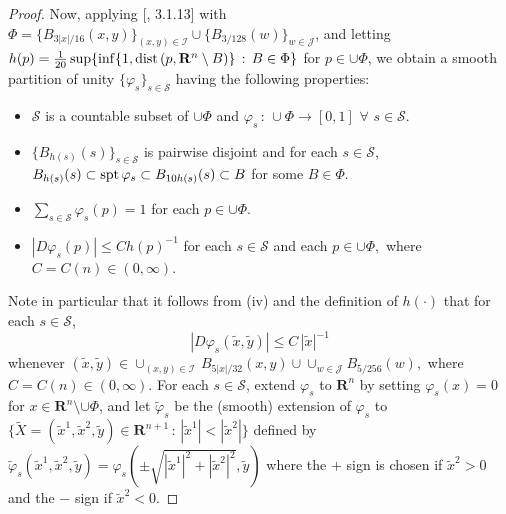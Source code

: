 \documentclass[a4paper,11pt]{amsart}
\begin{document}
\begin{proof}
 Now, applying [\cite{F}, 3.1.13] with 
 $\Phi = \{B_{3|x|/16}(x,y)\}_{(x,y) \in {\mathcal I}} \cup \{B_{3/128}(w)\}_{w \in {\mathcal J}}$, 
 and letting $h(p) = \frac{1}{20}\sup \{\inf\{1, {\rm dist} \, (p, {\mathbf R}^{n} \setminus B)\} \, : \, B \in \Phi\}$ for $p \in \cup \Phi$, we obtain a smooth partition of unity $\{\varphi_{s}\}_{s \in {\mathcal S}}$ having the following properties:
\begin{itemize}
\item[(i)] ${\mathcal S}$ is a countable subset of $\cup \Phi$ and $\varphi_{s} \, : \, \cup \Phi \to [0, 1]$
$\forall$ $s \in {\mathcal S}$.
\item[(ii)] $\{B_{h(s)}(s)\}_{s \in {\mathcal S}}$ is pairwise disjoint and for each $s \in {\mathcal S}$, 
$B_{h(s)}(s)\subset {\rm spt} \, \varphi_{s} \subset B_{10h(s)}(s) \subset B$ for some $B \in \Phi$. 
\item[(iii)] $\sum_{s \in {\mathcal S}} \varphi_{s}(p) = 1$ for each $p \in \cup \Phi$.
\item[(iv)] $|D\varphi_{s}(p)| \leq Ch(p)^{-1}$
for each $s \in {\mathcal S}$ and each $p \in \cup \Phi,$
where $C = C(n) \in (0, \infty).$ 
\end{itemize}
 Note in particular that it follows from (iv) and the definition of $h(\cdot)$ that for each $s \in {\mathcal S}$, 
\begin{equation}\label{L2-est-S5}
|D\varphi_{s}(\widetilde{x}, \widetilde{y})| \leq C \, |\widetilde{x}|^{-1}
\end{equation}
whenever $(\widetilde{x}, \widetilde{y}) \in \cup_{(x,y) \in {\mathcal I}} \, B_{5|x|/32}(x,y) \cup \cup_{w \in {\mathcal J}} B_{5/256}(w),$ where $C = C(n) \in (0, \infty).$ For each $s \in {\mathcal S}$, extend $\varphi_{s}$ to ${\mathbf R}^{n}$ by setting 
$\varphi_{s}(x) = 0$ for $x \in {\mathbf R}^{n} \setminus \cup\Phi$, and let $\widetilde{\varphi}_{s}$ be the (smooth) extension of $\varphi_{s}$  to 
$\{\widetilde{X} = (\widetilde{x}^{1}, \widetilde{x}^{2}, \widetilde{y}) \in {\mathbf R}^{n+1} \, : \, 
|\widetilde{x}^{1}| < |\widetilde{x}^{2}|\}$ defined by  
$\widetilde{\varphi}_{s}(\widetilde{x}^{1}, \widetilde{x}^{2}, \widetilde{y}) = \varphi_{s}(\pm\sqrt{|\widetilde{x}^{1}|^{2} + 
|\widetilde{x}^{2}|^{2}}, \widetilde{y})$ where the $+$ sign is chosen if $\widetilde{x}^{2} >0$ and 
the $-$ sign if $\widetilde{x}^{2} < 0.$ 


\end{proof}
\end{document}
